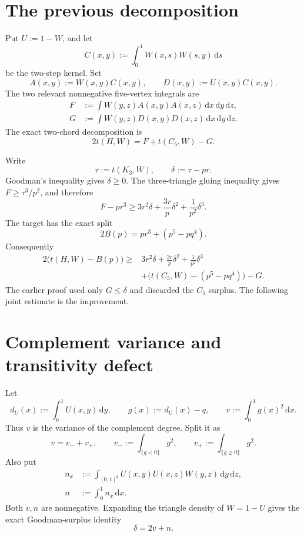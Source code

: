 \documentclass[11pt]{article}
\theoremstyle{remark}
\newcommand{\dd}{\,\mathrm d}
\begin{document}
\section{The previous decomposition}

Put $U:=1-W$, and let
\[
 C(x,y):=\int_0^1 W(x,s)W(s,y)\dd s
\]
be the two-step kernel.  Set
\[
 A(x,y):=W(x,y)C(x,y),
 \qquad
 D(x,y):=U(x,y)C(x,y).
\]
The two relevant nonnegative five-vertex integrals are
\begin{align}
 F&:=\int W(y,z)A(x,y)A(x,z)\dd x\dd y\dd z,\label{eq:F}\\
 G&:=\int W(y,z)D(x,y)D(x,z)\dd x\dd y\dd z.\label{eq:G}
\end{align}
The exact two-chord decomposition is
\begin{equation}\label{eq:two-chord}
 2t(H,W)=F+t(C_5,W)-G.
\end{equation}

Write
\[
 \tau:=t(K_3,W),
 \qquad
 \delta:=\tau-pr.
\]
Goodman's inequality gives $\delta\geq0$.  The three-triangle gluing
inequality gives $F\geq\tau^3/p^2$, and therefore
\begin{equation}\label{eq:F-surplus}
 F-pr^3
 \geq
 3r^2\delta+\frac{3r}{p}\delta^2+\frac1{p^2}\delta^3.
\end{equation}
The target has the exact split
\begin{equation}\label{eq:target-split}
 2B(p)=pr^3+(p^5-pq^4).
\end{equation}
Consequently
\begin{equation}\label{eq:gap-start}
 \begin{aligned}
 2\bigl(t(H,W)-B(p)\bigr)
 \geq{}&
 3r^2\delta+\frac{3r}{p}\delta^2+\frac1{p^2}\delta^3\\
 &+\bigl(t(C_5,W)-(p^5-pq^4)\bigr)-G.
 \end{aligned}
\end{equation}
The earlier proof used only $G\leq\delta$ and discarded the $C_5$
surplus.  The following joint estimate is the improvement.

\section{Complement variance and transitivity defect}

Let
\[
 d_U(x):=\int_0^1U(x,y)\dd y,
 \qquad
 g(x):=d_U(x)-q,
 \qquad
 v:=\int_0^1g(x)^2\dd x.
\]
Thus $v$ is the variance of the complement degree.  Split it as
\[
 v=v_-+v_+,
 \qquad
 v_-:=\int_{\{g<0\}}g^2,
 \qquad
 v_+:=\int_{\{g\geq0\}}g^2.
\]
Also put
\begin{align}
 n_x&:=\int_{[0,1]^2}
 U(x,y)U(x,z)W(y,z)\dd y\dd z,\label{eq:nx}\\
 n&:=\int_0^1n_x\dd x.\label{eq:n}
\end{align}
Both $v,n$ are nonnegative.  Expanding the triangle density of
$W=1-U$ gives the exact Goodman-surplus identity
\begin{equation}\label{eq:delta-vn}
 \boxed{\delta=2v+n.}
\end{equation}
\end{document}
